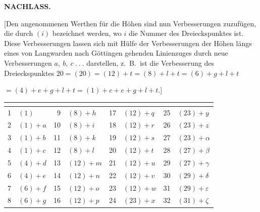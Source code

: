 \par\clearpage
\noindent{}\hfill{\small\textbf{NACHLASS.}}\hfill\null\par\medskip
\par\noindent\hspace*{\parindent}[Den angenommenen Werthen für die Höhen sind nun Verbesserungen
zuzufügen, die durch \((i)\) bezeichnet werden, wo \(i\) die Nummer des Dreieckspunktes
ist. Diese Verbesserungen lassen sich mit Hülfe der Verbesserungen der Höhen längs
eines von Langwarden nach Göttingen gehenden Linienzuges durch neue Verbesserungen
\(a,\ b,\ c\ .\ .\ .\) darstellen, z.\ B.\ ist die Verbesserung des Dreieckspunktes
\(20=(20)=(12)+t=(8)+l+t=(6)+g+l+t\)
\par\noindent\hfill \(=(4)+e+g+l+t=(1)+c+e+g+l+t.\)]
\par\medskip
{\centering
\setlength{\tabcolsep}{.57em}
\begin{tabular}{|r|l||r|l||r|l||r|l|}
&
&
&
&
&
&
&
\\[3pt]
 & \((1)\) & 9 & \((8)+h\) & 17 & \((12)+q\) & 25 & \((23)+y\)\\
2 & \((1)+a\) & 10 & \((8)+i\) & 18 & \((12)+r\) & 26 & \((23)+z\)\\
3 & \((1)+b\) & 11 & \((8)+k\) & 19 & \((12)+s\) & 27 & \((23)+\alpha\)\\
4 & \((1)+c\) & 12 & \((8)+l\) & 20 & \((12)+t\) & 28 & \((27)+\beta\)\\
5 & \((4)+d\) & 13 & \((12)+m\) & 21 & \((12)+u\) & 29 & \((27)+\gamma\)\\
6 & \((4)+e\) & 14 & \((12)+n\) & 22 & \((12)+v\) & 30 & \((29)+\delta\)\\
7 & \((6)+f\) & 15 & \((12)+o\) & 23 & \((12)+w\) & 31 & \((29)+\varepsilon\)\\
8 & \((6)+g\) & 16 & \((12)+p\) & 24 & \((23)+x\) & 32 & \((31)+\zeta\)\\
\end{tabular}\par}

